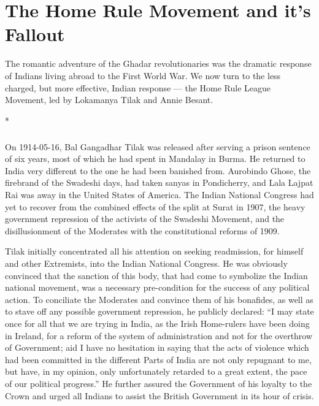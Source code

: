 \chapter{The Home Rule Movement and it's Fallout}
\begin{multicols}{2}

The romantic adventure of the Ghadar revolutionaries was the dramatic response of Indians living abroad to the First World War. We now turn to the less charged, but more effective, Indian response --- the Home Rule League Movement, led by Lokamanya Tilak and Annie Besant.

\begin{center}*\end{center}

\paragraph*{}

On 1914-05-16, Bal Gangadhar Tilak was released after serving a prison sentence of six years, most of which he had spent in Mandalay in Burma. He returned to India very different to the one he had been banished from. Aurobindo Ghose, the firebrand of the Swadeshi days, had taken sanyas in Pondicherry, and Lala Lajpat Rai was away in the United States of America. The Indian National Congress had yet to recover from the combined effects of the split at Surat in 1907, the heavy government repression of the activists of the Swadeshi Movement, and the disillusionment of the Moderates with the constitutional reforms of 1909.

Tilak initially concentrated all his attention on seeking readmission, for himself and other Extremists, into the Indian National Congress. He was obviously convinced that the sanction of this body, that had come to symbolize the Indian national movement, was a necessary pre-condition for the success of any political action. To conciliate the Moderates and convince them of his bonafides, as well as to stave off any possible government repression, he publicly declared: ``I may state once for all that we are trying in India, as the Irish Home-rulers have been doing in Ireland, for a reform of the system of administration and not for the overthrow of Government; aid I have no hesitation in saying that the acts of violence which had been committed in the different Parts of India are not only repugnant to me, but have, in my opinion, only unfortunately retarded to a great extent, the pace of our political progress.'' He further assured the Government of his loyalty to the Crown and urged all Indians to assist the British Government in its hour of crisis.


\end{multicols}
